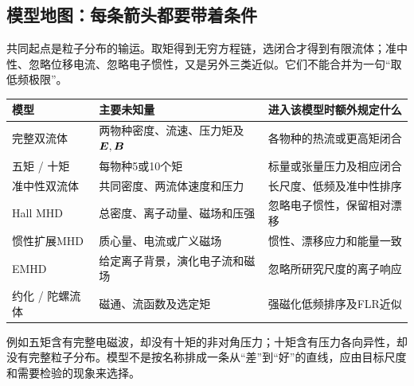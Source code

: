 \subsection{模型地图：每条箭头都要带着条件}
共同起点是粒子分布的输运。取矩得到无穷方程链，选闭合才得到有限流体；准中性、忽略位移电流、忽略电子惯性，又是另外三类近似。它们不能合并为一句“取低频极限”。
\begin{longtable}{P{30mm}P{59mm}P{60mm}}
\toprule 模型 & 主要未知量 & 进入该模型时额外规定什么\\\midrule
完整双流体 & 两物种密度、流速、压力矩及$\bm{E},\bm{B}$ & 各物种的热流或更高矩闭合\\
五矩 / 十矩 & 每物种5或10个矩 & 标量或张量压力及相应闭合\\
准中性双流体 & 共同密度、两流体速度和压力 & 长尺度、低频及准中性排序\\
Hall MHD & 总密度、离子动量、磁场和压强 & 忽略电子惯性，保留相对漂移\\
惯性扩展MHD & 质心量、电流或广义磁场 & 惯性、漂移应力和能量一致\\
EMHD & 给定离子背景，演化电子流和磁场 & 忽略所研究尺度的离子响应\\
约化 / 陀螺流体 & 磁通、流函数及选定矩 & 强磁化低频排序及FLR近似\\\bottomrule
\end{longtable}
例如五矩含有完整电磁波，却没有十矩的非对角压力；十矩含有压力各向异性，却没有完整粒子分布。模型不是按名称排成一条从“差”到“好”的直线，应由目标尺度和需要检验的现象来选择。\citep{Hakim2008,Wang2015}
